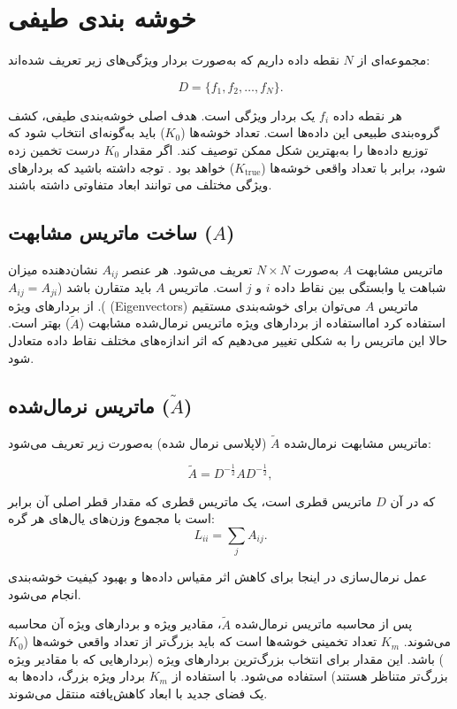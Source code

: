 \documentclass[a4paper,12pt,openany]{report}
\begin{document}
	\chapter{خوشه بندی طیفی}

	

مجموعه‌ای از \( N \) نقطه داده داریم که به‌صورت بردار ویژگی‌های زیر تعریف شده‌اند:

\[
D = \{f_1, f_2, \dots, f_N\}.
\]

هر نقطه داده \( f_i \) یک بردار ویژگی است.  
هدف اصلی خوشه‌بندی طیفی، کشف گروه‌بندی طبیعی این داده‌ها است.  
تعداد خوشه‌ها (\( K_0 \)) باید به‌گونه‌ای انتخاب شود که توزیع داده‌ها را به‌بهترین شکل ممکن توصیف کند. اگر مقدار \( K_0 \) درست تخمین زده شود، برابر با تعداد واقعی خوشه‌ها (\( K_{\text{true}} \)) خواهد بود . توجه داشته باشید
که بردارهای ویژگی مختلف می توانند ابعاد متفاوتی داشته باشند.

\section{ساخت ماتریس مشابهت (\( A \))}

ماتریس مشابهت \( A \) به‌صورت \( N \times N \) تعریف می‌شود.  
هر عنصر \( A_{ij} \) نشان‌دهنده میزان شباهت یا وابستگی بین نقاط داده \( i \) و \( j \) است.  
ماتریس \( A \) باید متقارن باشد (\( A_{ij} = A_{ji} \)).  
از بردارهای ویژه (Eigenvectors) ماتریس \( A \) می‌توان برای خوشه‌بندی مستقیم استفاده کرد 
امااستفاده از بردارهای ویژه ماتریس نرمال‌شده مشابهت (\( \tilde{A} \)) بهتر است.
حالا این ماتریس را به شکلی تغییر می‌دهیم که اثر اندازه‌های مختلف نقاط داده متعادل شود. 

\section{ ماتریس نرمال‌شده (\( \tilde{A} \))}

ماتریس مشابهت نرمال‌شده \( \tilde{A} \) (لاپلاسی نرمال شده) به‌صورت زیر تعریف می‌شود:

\[
\tilde{A} = D^{-\frac{1}{2}} A D^{-\frac{1}{2}},
\]

که در آن   \( D\) ماتریس قطری است، یک ماتریس قطری که مقدار قطر اصلی آن برابر است با مجموع وزن‌های یال‌های هر گره:
	\[
	L_{ii} = \sum_j A_{ij}.
	\]


عمل نرمال‌سازی در اینجا برای کاهش اثر مقیاس داده‌ها و بهبود کیفیت خوشه‌بندی انجام می‌شود.

پس از محاسبه ماتریس نرمال‌شده \( \tilde{A} \)، مقادیر ویژه و بردارهای ویژه آن محاسبه می‌شوند.  
\( K_m \) تعداد تخمینی خوشه‌ها است که باید بزرگ‌تر از تعداد واقعی خوشه‌ها (\( K_0 \)) باشد.  
این مقدار برای انتخاب بزرگ‌ترین بردارهای ویژه (بردارهایی که با مقادیر ویژه بزرگ‌تر متناظر هستند) استفاده می‌شود.  
با استفاده از \( K_m \) بردار ویژه بزرگ، داده‌ها به یک فضای جدید با ابعاد کاهش‌یافته منتقل می‌شوند.  
\end{document}
